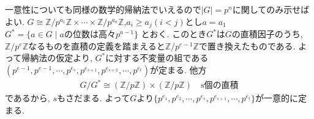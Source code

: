 \documentclass[dvipdfmx]{jsarticle}
\theoremstyle{definition}
\numberwithin{equation}{section}
\numberwithin{props}{section}
\numberwithin{definition}{section}
\numberwithin{note}{section}
\newcommand{\ZZ}{\mathbb{Z}}
\begin{document}
一意性についても同様の数学的帰納法でいえるので$\lvert G\rvert=p^n$に関してのみ示せばよい.
$G\cong\ZZ/p^{a_1}\ZZ\times\cdots\times\ZZ/p^{a_n}\ZZ$,$a_i \geq a_j (i<j)$とし$a=a_1$
$G^* = \lbrace a\in G\mid aの位数は高々 p^{a-1}\rbrace$
とおく. このとき$G^*$は$G$の直積因子のうち, $\ZZ/p^e\ZZ$なるものを直積の定義を踏まえると$\ZZ/p^{e-1}\ZZ$で置き換えたものである. よって帰納法の仮定より, $G^*$に対する不変量の組である$( p^{e-1},p^{e-1},\cdots,p^{e_s},p^{e_{s+1}},p^{e_{s+2}},\cdots,p^{e_t})$が定まる. 他方
\begin{align}
G/G^*\cong (\ZZ/p\ZZ)\times (\ZZ/p\ZZ)\quad \mathrm{s個の直積}
\end{align}
であるから, $s$もさだまる. よって$G$より$\lbrace p^{e_1},p^{e_2},\cdots,p^{e_s},p^{e_{s+1}},\cdots,p^{e_t}\rbrace$が一意的に定まる.
\end{document}
